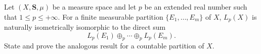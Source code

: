 Let $(X, \mathbf{S}, \mu)$ be a measure space and let $p$ be an extended real number such that $1 \leq p \leq +\infty$. For a finite measurable partition $\{E_1, \ldots, E_m\}$ of $X$, $L_p(X)$ is naturally isometrically isomorphic to the direct sum
$$L_p(E_1) \oplus_p \cdots \oplus_p L_p(E_m).$$
State and prove the analogous result for a countable partition of $X$.
